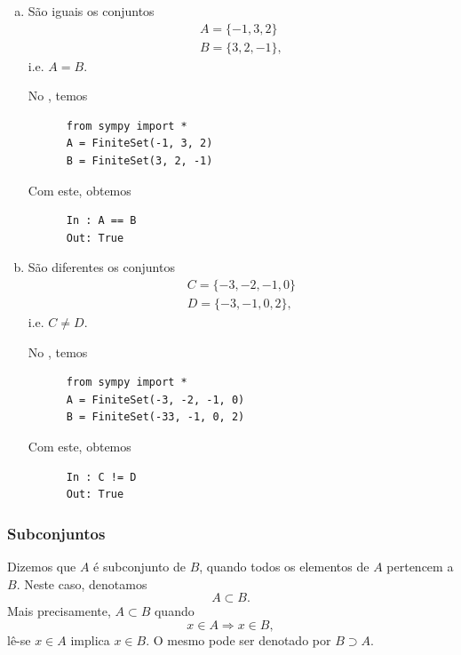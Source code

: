 \begin{ex}
  \begin{enumerate}[a)]
  \item São iguais os conjuntos
    \begin{gather}
      A = \{-1, 3, 2\}\\
      B = \{3, 2, -1\},
    \end{gather}
    i.e. $A = B$.

    \ifispython
    No \python, temos
    \begin{lstlisting}
      from sympy import *
      A = FiniteSet(-1, 3, 2)
      B = FiniteSet(3, 2, -1)
    \end{lstlisting}
    Com este, obtemos
    \begin{lstlisting}
      In : A == B
      Out: True
    \end{lstlisting}
    \fi

  \item São diferentes os conjuntos
    \begin{gather}
      C = \{-3, -2, -1, 0\}\\
      D = \{-3, -1, 0, 2\},
    \end{gather}
    i.e. $C\neq D$.

    \ifispython
    No \python, temos
    \begin{lstlisting}
      from sympy import *
      A = FiniteSet(-3, -2, -1, 0)
      B = FiniteSet(-33, -1, 0, 2)
    \end{lstlisting}
    Com este, obtemos
    \begin{lstlisting}
      In : C != D
      Out: True
    \end{lstlisting}
    \fi

  \end{enumerate}
\end{ex}

\subsubsection{Subconjuntos}

Dizemos que $A$ é subconjunto de $B$, quando todos os elementos de $A$ pertencem a $B$. Neste caso, denotamos
\begin{equation}
  A \subset B.
\end{equation}
Mais precisamente, $A\subset B$ quando
\begin{equation}
  x\in A \Rightarrow x\in B,
\end{equation}
lê-se $x\in A$ implica $x\in B$. O mesmo pode ser denotado por $B\supset A$.

